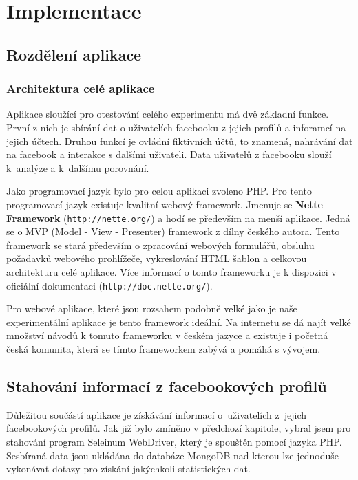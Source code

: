 \documentclass[thesis=M,czech]{FITthesis}[2013/05/10]
\begin{document}
\chapter{Implementace}

\section{Rozdělení aplikace}

\subsection{Architektura celé aplikace}

Aplikace sloužící pro otestování celého experimentu má dvě základní funkce. První z nich je sbírání dat o uživatelích facebooku z jejich profilů a inforamcí na jejich účtech. Druhou funkcí je ovládní fiktivních účtů, to znamená, nahrávání dat na facebook a interakce s dalšími uživateli. Data uživatelů z facebooku slouží k~analýze a k~dalšímu porovnání.

Jako programovací jazyk bylo pro celou aplikaci zvoleno PHP. Pro tento programovací jazyk existuje kvalitní webový framework. Jmenuje se \textbf{Nette Framework} (\verb|http://nette.org/|) a hodí se především na menší aplikace. Jedná se o MVP (Model - View - Presenter) framework z dílny českého autora. Tento framework se stará především o zpracování webových formulářů, obsluhu požadavků webového prohlížeče, vykreslování HTML šablon a celkovou architekturu celé aplikace. Více informací o tomto frameworku je k dispozici v oficiální dokumentaci (\verb|http://doc.nette.org/|). 

Pro webové aplikace, které jsou rozsahem podobně velké jako je naše experimentální aplikace je tento framework ideální. Na internetu se dá najít velké množství návodů k tomuto frameworku v českém jazyce a existuje i početná česká komunita, která se tímto frameworkem zabývá a pomáhá s vývojem. 


\section{Stahování informací z facebookových profilů}

Důležitou součástí aplikace je získávání informací o~uživatelích z~jejich facebookových profilů. Jak již bylo zmíněno v předchozí kapitole, vybral jsem pro stahování program Seleinum WebDriver, který je spouštěn pomocí jazyka PHP. Sesbíraná data jsou ukládána do databáze MongoDB nad kterou lze jednoduše vykonávat dotazy pro získání jakýchkoli statistických dat.
\end{document}
